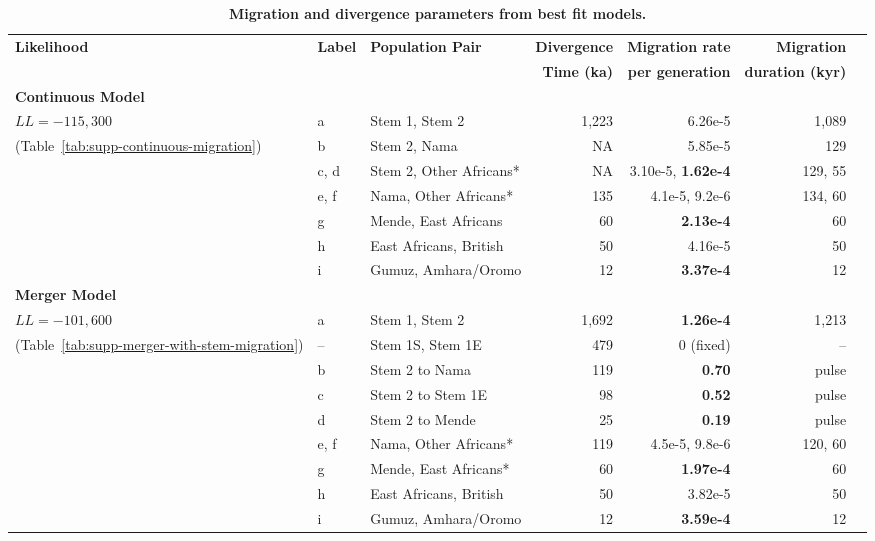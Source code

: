 \documentclass[]{article}
\begin{document}
\begin{table}[t!]
    \centering
    \scriptsize
    \begin{tabular}{lllrrrr}
        \toprule
        \textbf{Likelihood} & \textbf{Label} & \textbf{Population Pair} &
            \textbf{Divergence} & \textbf{Migration rate} & \textbf{Migration} \\
        & & & 
            \textbf{Time (ka)} & \textbf{per generation} & \textbf{duration (kyr)} \\
        \midrule
        \textbf{Continuous Model} & & & & & \\
        $LL= -115,300$ & a & Stem 1, Stem 2 & 1,223 & 6.26e-5 & 1,089 \\
        (Table~\ref{tab:supp-continuous-migration}) & b & Stem 2, Nama & NA & 5.85e-5 & 129 \\
        & c, d & Stem 2, Other Africans* & NA & 3.10e-5, \textbf{1.62e-4} & 129, 55 \\
        & e, f & Nama, Other Africans* & 135 & 4.1e-5, 9.2e-6 & 134, 60 \\
        & g & Mende, East Africans & 60 & \textbf{2.13e-4} & 60 \\
        & h & East Africans, British & 50 & 4.16e-5 & 50 \\
        & i & Gumuz, Amhara/Oromo & 12 &\textbf{3.37e-4} & 12 \\
        \textbf{Merger Model} & & & & & \\
        $LL= -101,600$ & a & Stem 1, Stem 2 & 1,692 & \textbf{1.26e-4} & 1,213 \\
        (Table~\ref{tab:supp-merger-with-stem-migration}) & -- & Stem 1S, Stem 1E & 479 & 0 (fixed) & -- \\
        & b & Stem 2 to Nama & 119 & \textbf{0.70} & pulse \\
        & c & Stem 2 to Stem 1E & 98 & \textbf{0.52} & pulse \\
        & d & Stem 2 to Mende & 25 & \textbf{0.19} & pulse \\
        & e, f & Nama, Other Africans* & 119 & 4.5e-5, 9.8e-6 & 120, 60 \\
        & g & Mende, East Africans* & 60 & \textbf{1.97e-4} & 60 \\
        & h & East Africans, British & 50 & 3.82e-5 & 50 \\
        & i & Gumuz, Amhara/Oromo &12 & \textbf{3.59e-4} & 12 \\
        \bottomrule
    \end{tabular}
    \caption{
        \textbf{Migration and divergence parameters from best fit models.}
}
\end{table}
\end{document}
